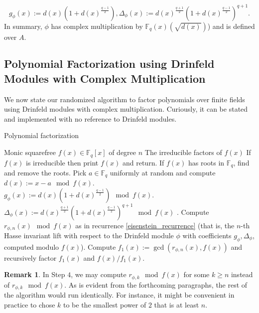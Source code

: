 \documentclass{article}
\theoremstyle{plain}
\theoremstyle{definition}
\newtheorem*{remark}{Remark}
\def\F{\ensuremath{\mathbb{F}}}
\def\K{\ensuremath{\mathbb{K}}}
\newcommand{\D}{\Delta}
\begin{document}
$$g_\phi(x):=d(x)(1+d(x)^{\frac{q-1}{2}}),\D_\phi(x):=d(x)^{\frac{q+1}{2}}(1+d(x)^{\frac{q-1}{2}})^{q+1}.$$
In summary, $\phi$ has complex multiplication by $\F_q(x)(\sqrt{d(x)})$) and is defined over $A$.
\subsection{Polynomial Factorization using Drinfeld Modules with Complex Multiplication}
We now state our randomized algorithm to factor polynomials over finite fields using Drinfeld modules with complex multiplication. Curiously, it can be stated and implemented with no reference to Drinfeld modules.


\begin{algorithm}[H]
	\caption{Polynomial factorization}
	\label{factoring_algorithm}
	\begin{algorithmic}[1]
		\REQUIRE Monic squarefree $f(x) \in \F_q[x]$ of degree $n$
		\ENSURE The irreducible factors of $f(x)$
		\STATE If $f(x)$ is irreducible then print $f(x)$ and return.
		\STATE If $f(x)$ has roots in $\F_q$, find and remove the roots.
		\STATE Pick $a \in \F_q$ uniformly at random and compute \\ %
		$d(x) := x-a \mod f(x)$. \\
		$g_\phi(x) := d(x)(1+d(x)^{\frac{q-1}{2}}) \mod f(x)$. \\
		$\Delta_\phi(x) := d(x)^{\frac{q+1}{2}}(1+d(x)^{\frac{q-1}{2}})^{q+1} \mod f(x)$ .
		\STATE Compute $r_{\phi,n}(x) \mod f(x)$ as in recurrence \ref{eisenstein_recurrence} (that is, the $n$-th Hasse invariant lift with respect to the Drinfeld module $\phi$ with coefficients $g_\phi, \Delta_\phi$, computed modulo $f(x)$).
		\STATE Compute $f_1(x) := \gcd(r_{\phi,n}(x), f(x))$ and recursively factor $f_1(x)$ and $f(x)/f_1(x)$.
	\end{algorithmic}
\end{algorithm}

\begin{remark}
	In Step $4$, we may compute $r_{\phi,k} \mod f(x)$ for some $k\geq n$ instead of $r_{\phi,k} \mod f(x)$. As is evident from the forthcoming paragraphs, the rest of the algorithm would run identically. For instance, it might be convenient in practice to chose $k$ to be the smallest power of $2$ that is at least $n$.
\end{remark}


\end{document}

